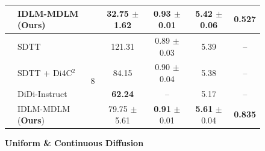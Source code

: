 \begin{figure}[t]
\begin{minipage}[t]{0.49\textwidth}
{\begin{tabular}{llccccc}
          & IDLM-MDLM (\textbf{Ours}) & & \textbf{32.75} $\pm$ 1.62 & \textbf{0.93} $\pm$ 0.01 & 5.42 $\pm$ 0.06 & \textbf{0.527} \\
          \midrule
          & SDTT~\citep{deschenaux2024beyond} & \multirow{4}{*}{8} & 121.31 & 0.89 $\pm$ 0.03 & 5.39 & -- \\
          & SDTT + Di4C$^2$~\citep{hayakawa2025distillation} & & 84.15 & 0.90 $\pm$ 0.04 & 5.38 & -- \\
          & DiDi-Instruct~\citep{zheng2026ultrafast} & & \textbf{62.24} & -- & 5.17 & -- \\
          & IDLM-MDLM (\textbf{Ours}) & & 79.75 $\pm$ 5.61 & \textbf{0.91} $\pm$ 0.01 & \textbf{5.61} $\pm$ 0.04 & \textbf{0.835} \\
          \bottomrule
      \end{tabular}}
    \end{minipage}\hfill
    \begin{minipage}[t]{0.49\textwidth}
      \centering
      \textbf{Uniform \& Continuous Diffusion}\\[0.5mm]
      \scriptsize
      \renewcommand{\arraystretch}{0.90}
      \setlength{\tabcolsep}{7pt}
\end{minipage}
\end{figure}
